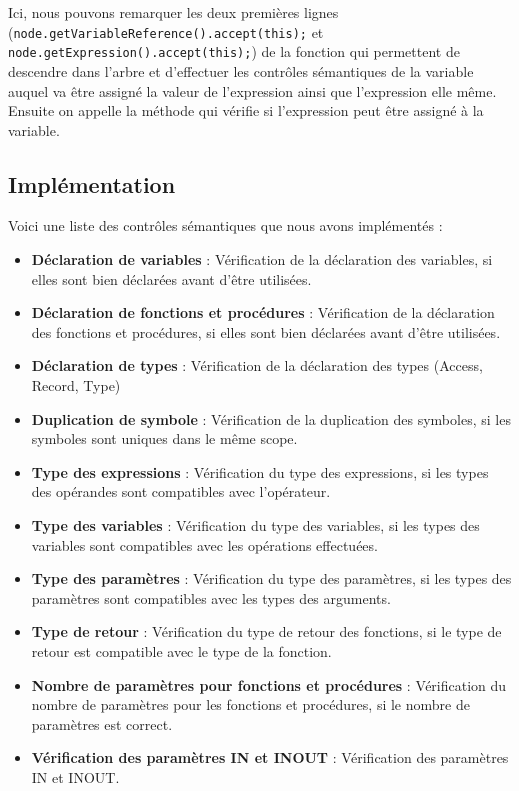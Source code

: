 \documentclass[french,a4paper]{article}
\begin{document}
    Ici, nous pouvons remarquer les deux premières lignes (\texttt{node.getVariableReference().accept(this);} et \texttt{node.getExpression().accept(this);}) de la fonction qui permettent de descendre dans l'arbre et d'effectuer les contrôles sémantiques de la variable auquel va être assigné la valeur de l'expression ainsi que l'expression elle même. Ensuite on appelle la méthode qui vérifie si l'expression peut être assigné à la variable.


    \subsection{Implémentation}
    Voici une liste des contrôles sémantiques que nous avons implémentés :
    \begin{itemize}
        \item \textbf{Déclaration de variables} : Vérification de la déclaration des variables, si elles sont bien déclarées avant d'être utilisées.
        \item \textbf{Déclaration de fonctions et procédures} : Vérification de la déclaration des fonctions et procédures, si elles sont bien déclarées avant d'être utilisées.
        \item \textbf{Déclaration de types} : Vérification de la déclaration des types (Access, Record, Type)
        \item \textbf{Duplication de symbole} : Vérification de la duplication des symboles, si les symboles sont uniques dans le même scope.
        \item \textbf{Type des expressions} : Vérification du type des expressions, si les types des opérandes sont compatibles avec l'opérateur.
        \item \textbf{Type des variables} : Vérification du type des variables, si les types des variables sont compatibles avec les opérations effectuées.
        \item \textbf{Type des paramètres} : Vérification du type des paramètres, si les types des paramètres sont compatibles avec les types des arguments.
        \item \textbf{Type de retour} : Vérification du type de retour des fonctions, si le type de retour est compatible avec le type de la fonction.
        \item \textbf{Nombre de paramètres pour fonctions et procédures} : Vérification du nombre de paramètres pour les fonctions et procédures, si le nombre de paramètres est correct.
        \item \textbf{Vérification des paramètres IN et INOUT} : Vérification des paramètres IN et INOUT.
    \end{itemize}
\end{document}
